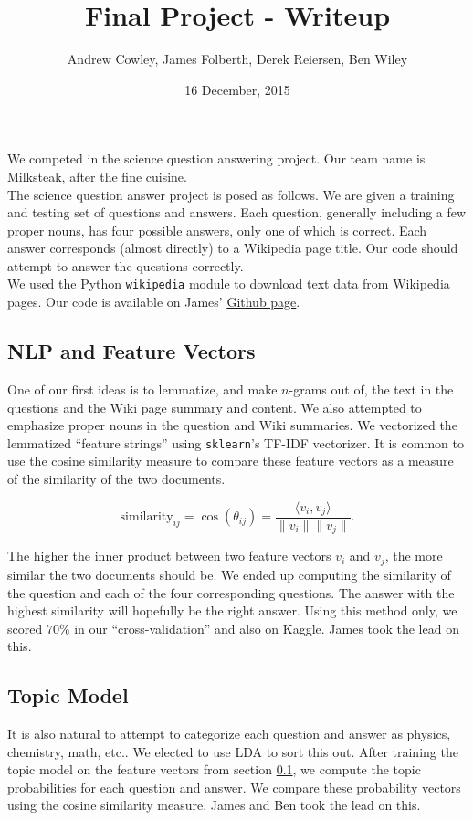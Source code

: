 \documentclass{article}
\title{Final Project - Writeup}
\date{16 December, 2015}
\author{Andrew Cowley, James Folberth, Derek Reiersen, Ben Wiley}
\theoremstyle{mystuff}
\theoremstyle{myexample}
\theoremstyle{named}
\begin{document}
\maketitle

We competed in the science question answering project.  Our team name is Milksteak, after the fine cuisine.\\

The science question answer project is posed as follows.  We are given a training and testing set of questions and answers.  Each question, generally including a few proper nouns, has four possible answers, only one of which is correct.  Each answer corresponds (almost directly) to a Wikipedia page title.  Our code should attempt to answer the questions correctly.\\

We used the Python \texttt{wikipedia} module to download text data from Wikipedia pages.  Our code is available on James' \href{https://github.com/jamesfolberth/ml_project}{Github page}.\\

\subsection{NLP and Feature Vectors}
\label{ssec:nlp}
One of our first ideas is to lemmatize, and make $n$-grams out of, the text in the questions and the Wiki page summary and content.  We also attempted to emphasize proper nouns in the question and Wiki summaries.  We vectorized the lemmatized ``feature strings'' using \texttt{sklearn}'s TF-IDF vectorizer.  It is common to use the cosine similarity measure to compare these feature vectors as a measure of the similarity of the two documents.

\[ \text{similarity}_{ij} = \cos(\theta_{ij}) = \dfrac{\langle v_i, v_j\rangle}{\|v_i\|\|v_j\|}. \] 

\noindent The higher the inner product between two feature vectors $v_i$ and $v_j$, the more similar the two documents should be.  We ended up computing the similarity of the question and each of the four corresponding questions.  The answer with the highest similarity will hopefully be the right answer.  Using this method only, we scored $70\%$ in our ``cross-validation'' and also on Kaggle.  James took the lead on this.\\


\subsection{Topic Model}
\label{ssec:topic_model}
It is also natural to attempt to categorize each question and answer as physics, chemistry, math, etc..  We elected to use LDA to sort this out.  After training the topic model on the feature vectors from section \ref{ssec:nlp}, we compute the topic probabilities for each question and answer.  We compare these probability vectors using the cosine similarity measure.  James and Ben took the lead on this.\\
\end{document}
